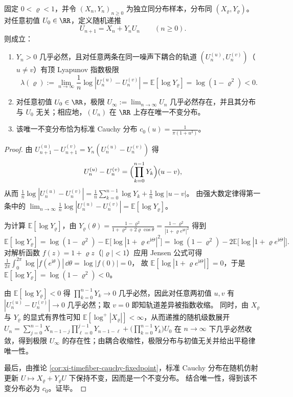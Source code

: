 \begin{theorem}\label{thm:xi-timefiber-random-affine-lyapunov-cauchy-unique}
固定 \(0<\varrho<1\)，并令 \((X_n,Y_n)_{n\ge 0}\) 为独立同分布样本，分布同 \((X_\varrho,Y_\varrho)\)。
对任意初值 \(U_0\in\RR\)，定义随机递推
\[
U_{n+1}=X_n+Y_nU_n\qquad(n\ge 0).
\]
则成立：
\begin{enumerate}
  \item \(Y_n>0\) 几乎必然，且对任意两条在同一噪声下耦合的轨道 \((U_n^{(u)},U_n^{(v)})\)（\(u\neq v\)）有顶 Lyapunov 指数极限
  \[
  \lambda(\varrho)
  :=\lim_{n\to\infty}\frac1n\log|U_n^{(u)}-U_n^{(v)}|
  =\mathbb{E}[\log Y_\varrho]
  =\log(1-\varrho^2)<0.
  \]
  \item 对任意初值 \(U_0\in\RR\)，极限 \(U_\infty:=\lim_{n\to\infty}U_n\) 几乎必然存在，并且其分布与 \(U_0\) 无关；相应地，\((U_n)\) 在 \(\RR\) 上存在唯一不变分布。
  \item 该唯一不变分布恰为标准 Cauchy 分布 \(c_0(u)=\frac{1}{\pi(1+u^2)}\)。
\end{enumerate}
\end{theorem}
\begin{proof}
由 \(U_{n+1}^{(u)}-U_{n+1}^{(v)}=Y_n(U_n^{(u)}-U_n^{(v)})\) 得
\[
U_n^{(u)}-U_n^{(v)}=\Bigl(\prod_{k=0}^{n-1}Y_k\Bigr)(u-v),
\]
从而
\(
\frac1n\log|U_n^{(u)}-U_n^{(v)}|
=\frac1n\sum_{k=0}^{n-1}\log Y_k+\frac1n\log|u-v|
\)。
由强大数定律得第一条中的
\(
\lim_{n\to\infty}\frac1n\log|U_n^{(u)}-U_n^{(v)}|
=\mathbb{E}[\log Y_\varrho]
\)。
\par
为计算 \(\mathbb{E}[\log Y_\varrho]\)，由
\(
Y_\varrho(\theta)=\frac{1-\varrho^2}{1+\varrho^2+2\varrho\cos\theta}
=\frac{1-\varrho^2}{|1+\varrho e^{\mathrm{i}\theta}|^2}
\)
得到
\[
\mathbb{E}[\log Y_\varrho]
=\log(1-\varrho^2)-\mathbb{E}\bigl[\log|1+\varrho e^{\mathrm{i}\Theta}|^2\bigr]
=\log(1-\varrho^2)-2\mathbb{E}\bigl[\log|1+\varrho e^{\mathrm{i}\Theta}|\bigr].
\]
对解析函数 \(f(z)=1+\varrho z\)（\(|\varrho|<1\)）应用 Jensen 公式可得
\(
\frac1{2\pi}\int_{0}^{2\pi}\log|f(e^{\mathrm{i}\theta})|\,\dd\theta=\log|f(0)|=0
\)，
故 \(\mathbb{E}[\log|1+\varrho e^{\mathrm{i}\Theta}|]=0\)，于是
\(
\mathbb{E}[\log Y_\varrho]=\log(1-\varrho^2)<0
\)。
\par
由 \(\mathbb{E}[\log Y_\varrho]<0\) 得 \(\prod_{k=0}^{n-1}Y_k\to 0\) 几乎必然，因此对任意两初值 \(u,v\) 有 \(|U_n^{(u)}-U_n^{(v)}|\to 0\) 几乎必然；取 \(v=0\) 即知轨道差异被指数收缩。
同时，由 \(X_\varrho\) 与 \(Y_\varrho\) 的显式有界性可知 \(\mathbb{E}[\log^+|X_\varrho|]<\infty\)，从而递推的随机级数展开
\(
U_n=\sum_{j=0}^{n-1}X_{n-1-j}\prod_{\ell=0}^{j-1}Y_{n-1-\ell}+\bigl(\prod_{k=0}^{n-1}Y_k\bigr)U_0
\)
在 \(n\to\infty\) 下几乎必然收敛，得到极限 \(U_\infty\) 的存在性；由耦合收缩性，极限分布与初值无关并给出平稳律唯一性。
\par
最后，由推论 \ref{cor:xi-timefiber-cauchy-fixedpoint}，标准 Cauchy 分布在随机仿射更新 \(U\mapsto X_\varrho+Y_\varrho U\) 下保持不变，因而是一个不变分布。
结合唯一性，得到该不变分布必为 \(c_0\)。证毕。
\end{proof}

